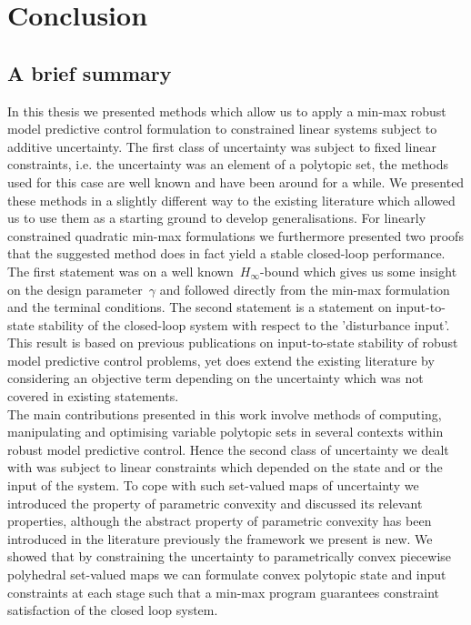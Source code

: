 
\chapter{Conclusion}
%
%
%
%
\section{A brief summary}
%

In this thesis we presented methods which allow us to apply a min-max robust model predictive control formulation to constrained linear systems subject to additive uncertainty.
%
The first class of uncertainty was subject to fixed linear constraints, i.e. the uncertainty was an element of a polytopic set, the methods used for this case are well known and have been around for a while.
%
We presented these methods in a slightly different way to the existing literature which allowed us to use them as a starting ground to develop generalisations.
%
For linearly constrained quadratic min-max formulations we furthermore presented two proofs that the suggested method does in fact yield a stable closed-loop performance.
%
The first statement was on a well known~$H_\infty$-bound which gives us some insight on the design parameter~$\gamma$ and followed directly from the min-max formulation and the terminal conditions.
%
The second statement is a statement on input-to-state stability of the closed-loop system with respect to the 'disturbance input'.
%
This result is based on previous publications on input-to-state stability of robust model predictive control problems, yet does extend the existing literature by considering an objective term depending on the uncertainty which was not covered in existing statements.
%
\\[1em]
%
The main contributions presented in this work involve methods of computing, manipulating and optimising variable polytopic sets in several contexts within robust model predictive control.
%
Hence the second class of uncertainty we dealt with was subject to linear constraints which depended on the state and or the input of the system.
%
To cope with such set-valued maps of uncertainty we introduced the property of parametric convexity and discussed its relevant properties, although the abstract property of parametric convexity has been introduced in the literature previously the framework we present is new.
%
We showed that by constraining the uncertainty to parametrically convex piecewise polyhedral set-valued maps we can formulate convex polytopic state and input constraints at each stage such that a min-max program guarantees constraint satisfaction of the closed loop system.
